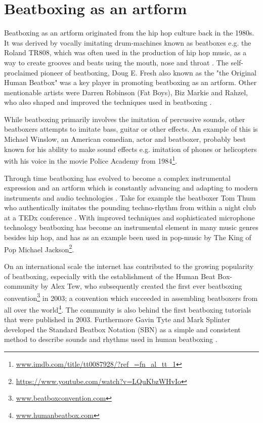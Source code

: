 \section{Beatboxing as an artform}
Beatboxing as an artform originated from the hip hop culture back in the 1980s. It was derived by vocally imitating drum-machines known as beatboxes e.g. the Roland TR808, which was often used in the production of hip hop music, as a way to create grooves and beats using the mouth, nose and throat \citep{proctor2012}. The self-proclaimed pioneer of beatboxing, Doug E. Fresh also known as the "the Original Human Beatbox" was a key player in promoting beatboxing as an artform. Other mentionable artists were Darren Robinson (Fat Boys), Biz Markie and Rahzel, who also shaped and improved the techniques used in beatboxing \citep{Hess2007}.

While beatboxing primarily involves the imitation of percussive sounds, other beatboxers attempts to imitate bass, guitar or other effects. An example of this is Michael Winslow, an American comedian, actor and beatboxer, probably best known for his ability to make sound effects e.g. imitation of phones or helicopters with his voice in the movie Police Academy from 1984\footnote{\url{www.imdb.com/title/tt0087928/?ref_=fn_al_tt_1}}. 

Through time beatboxing has evolved to become a complex instrumental expression and an artform which is constantly advancing and adapting to modern instruments and audio technologies \citep{proctor2012}. Take for example the beatboxer Tom Thum who authentically imitates the pounding techno-rhythm from within a night club at a TEDx conference \citep{TEDx}. With improved techniques and sophisticated microphone technology beatboxing has become an instrumental element in many music genres besides hip hop, and has as an example been used in pop-music by The King of Pop Michael Jackson\footnote{\url{https://www.youtube.com/watch?v=LQuKbzWHvIo}}.

On an international scale the internet has contributed to the growing popularity of beatboxing, especially with the establishment of the Human Beat Box-community by Alex Tew, who subsequently created the first ever beatboxing convention\footnote{\url{www.beatboxconvention.com}} in 2003; a convention which succeeded in assembling beatboxers from all over the world\footnote{\url{www.humanbeatbox.com}}.
The community is also behind the first beatboxing tutorials that were published in 2003. Furthermore Gavin Tyte and Mark Splinter developed the Standard Beatbox Notation (SBN) as a simple and consistent method to describe sounds and rhythms used in human beatboxing \citep{Tyte}.